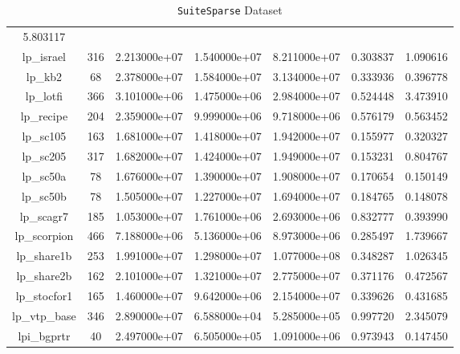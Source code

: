 \begin{table}[h]
\begin{tabular}{ccccccc}
    5.803117\\
    lp\_israel & 316 & 2.213000e+07 & 1.540000e+07 & 8.211000e+07 & 0.303837 &
    1.090616\\
    lp\_kb2 & 68 & 2.378000e+07 & 1.584000e+07 & 3.134000e+07 & 0.333936 &
    0.396778\\
    lp\_lotfi & 366 & 3.101000e+06 & 1.475000e+06 & 2.984000e+07 & 0.524448 &
    3.473910\\
    lp\_recipe & 204 & 2.359000e+07 & 9.999000e+06 & 9.718000e+06 & 0.576179 &
    0.563452\\
    lp\_sc105 & 163 & 1.681000e+07 & 1.418000e+07 & 1.942000e+07 & 0.155977 &
    0.320327\\
    lp\_sc205 & 317 & 1.682000e+07 & 1.424000e+07 & 1.949000e+07 & 0.153231 &
    0.804767\\
    lp\_sc50a & 78 & 1.676000e+07 & 1.390000e+07 & 1.908000e+07 & 0.170654 &
    0.150149\\
    lp\_sc50b & 78 & 1.505000e+07 & 1.227000e+07 & 1.694000e+07 & 0.184765 &
    0.148078\\
    lp\_scagr7 & 185 & 1.053000e+07 & 1.761000e+06 & 2.693000e+06 & 0.832777 &
    0.393990\\
    lp\_scorpion & 466 & 7.188000e+06 & 5.136000e+06 & 8.973000e+06 & 0.285497
    & 1.739667\\
    lp\_share1b & 253 & 1.991000e+07 & 1.298000e+07 & 1.077000e+08 & 0.348287
    & 1.026345\\
    lp\_share2b & 162 & 2.101000e+07 & 1.321000e+07 & 2.775000e+07 & 0.371176
    & 0.472567\\
    lp\_stocfor1 & 165 & 1.460000e+07 & 9.642000e+06 & 2.154000e+07 & 0.339626
    & 0.431685\\
    lp\_vtp\_base & 346 & 2.890000e+07 & 6.588000e+04 & 5.285000e+05 &
    0.997720 & 2.345079\\
    lpi\_bgprtr & 40 & 2.497000e+07 & 6.505000e+05 & 1.091000e+06 & 0.973943 &
    0.147450\\
    \hline
  \end{tabular}
  \caption{\texttt{SuiteSparse} Dataset}
\end{table}

